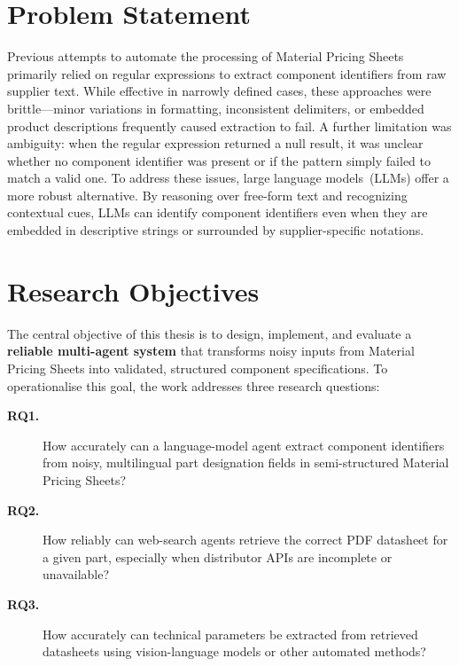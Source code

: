 \section{Problem Statement }
Previous attempts to automate the processing of Material Pricing Sheets primarily relied on regular expressions to extract component identifiers from raw supplier text.  
While effective in narrowly defined cases, these approaches were brittle---minor variations in formatting, inconsistent delimiters, or embedded product descriptions frequently caused extraction to fail.  
A further limitation was ambiguity: when the regular expression returned a null result, it was unclear whether no component identifier was present or if the pattern simply failed to match a valid one.  
To address these issues, large language models~(LLMs) offer a more robust alternative.  
By reasoning over free-form text and recognizing contextual cues, LLMs can identify component identifiers even when they are embedded in descriptive strings or surrounded by supplier-specific notations.

\section{Research Objectives }
The central objective of this thesis is to design, implement, and evaluate a \textbf{reliable multi-agent system} that transforms noisy inputs from Material Pricing Sheets into validated, structured component specifications.  
To operationalise this goal, the work addresses three research questions:

\begin{description}
\item[\textbf{RQ1.}] How accurately can a language-model agent extract component identifiers from noisy, multilingual part designation fields in semi-structured Material Pricing Sheets?

\item[\textbf{RQ2.}] How reliably can web-search agents retrieve the correct PDF datasheet for a given part, especially when distributor APIs are incomplete or unavailable?

\item[\textbf{RQ3.}] How accurately can technical parameters be extracted from retrieved datasheets using vision-language models or other automated methods?
\end{description}

